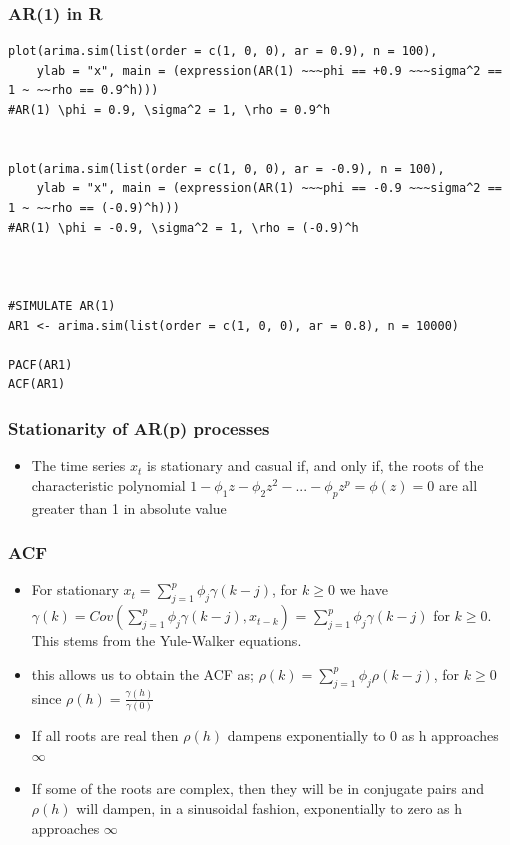 \documentclass{article}
\begin{document}
\subsubsection{AR(1) in R}
\begin{lstlisting}
plot(arima.sim(list(order = c(1, 0, 0), ar = 0.9), n = 100),
    ylab = "x", main = (expression(AR(1) ~~~phi == +0.9 ~~~sigma^2 == 1 ~ ~~rho == 0.9^h)))
#AR(1) \phi = 0.9, \sigma^2 = 1, \rho = 0.9^h


plot(arima.sim(list(order = c(1, 0, 0), ar = -0.9), n = 100), 
    ylab = "x", main = (expression(AR(1) ~~~phi == -0.9 ~~~sigma^2 == 1 ~ ~~rho == (-0.9)^h)))
#AR(1) \phi = -0.9, \sigma^2 = 1, \rho = (-0.9)^h



#SIMULATE AR(1)
AR1 <- arima.sim(list(order = c(1, 0, 0), ar = 0.8), n = 10000)

PACF(AR1)
ACF(AR1)
\end{lstlisting}


\subsubsection{Stationarity of AR(p) processes}
\begin{itemize}
    \item The time series $x_t$ is stationary and casual if, and only if, the roots of the characteristic polynomial $1 - \phi_1 z - \phi_2 z^2 - ... -\phi_p z^p = \phi(z) = 0$ are all greater than 1 in absolute value
\end{itemize}




\subsubsection{ACF}
\begin{itemize}
    \item For stationary $x_t = \sum_{j=1}^p \phi_j \gamma (k-j) $, for $k \geq 0$ we have $\gamma(k) = Cov( \sum_{j=1}^p \phi_j \gamma (k-j) , x_{t-k})$ = $\sum_{j=1}^p \phi_j \gamma(k-j)$ for $k \geq 0$. This stems from the Yule-Walker equations.
    \item this allows us to obtain the ACF as; $\rho (k) = \sum_{j=1}^p \phi_j \rho(k-j)$, for $k \geq 0$ since $\rho(h) = \frac{\gamma(h)}{ \gamma(0)}$
    \item If all roots are real then $\rho(h)$ dampens exponentially to 0 as h approaches $\infty$
    \item If some of the roots are complex, then they  will be in conjugate pairs and $\rho(h)$ will dampen, in a sinusoidal fashion, exponentially to zero as h approaches $\infty$
\end{itemize}
\end{document}
